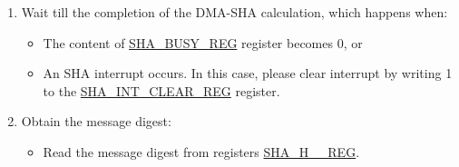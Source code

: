 \begin{enumerate}
    \item Wait till the completion of the DMA-SHA calculation, which happens when:
        \begin{itemize}
            \item The content of \hyperref[regdesc:SHABUSYREG]{SHA\_BUSY\_REG} register becomes 0, or
            \item An SHA interrupt occurs. In this case, please clear interrupt by writing 1 to the \hyperref[regdesc:SHAINTCLEARREG]{SHA\_INT\_CLEAR\_REG} register.
        \end{itemize}
    
    \item Obtain the message digest:
    \begin{itemize}
        \item Read the message digest from registers \hyperref[regdesc:SHAHNREG]{SHA\_H\_\_REG}.
    \end{itemize}
\end{enumerate}
